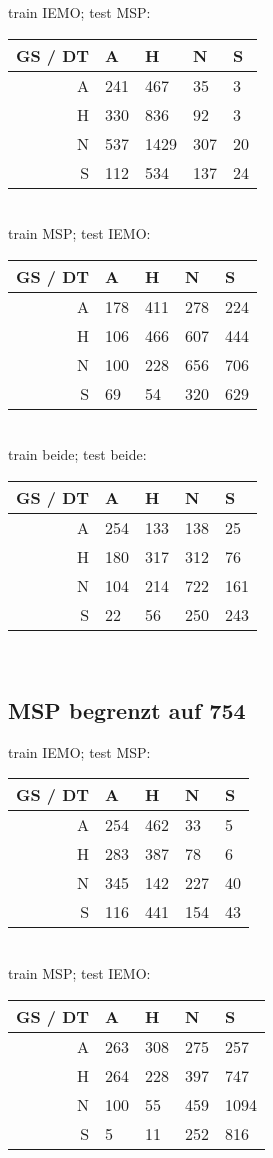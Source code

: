 \documentclass{article}
\begin{document}
train IEMO; test MSP:
\begin{tabular}{|r|llll|}
\hline
GS / DT & A & H & N & S \\
\hline
A & 241 & 467 & 35 & 3 \\
H & 330 & 836 & 92 & 3 \\
N & 537 & 1429 & 307 & 20 \\
S & 112 & 534 & 137 & 24 \\
\hline
\end{tabular} \\
train MSP; test IEMO:
\begin{tabular}{|r|llll|}
\hline
GS / DT & A & H & N & S \\
\hline
A & 178 & 411 & 278 & 224 \\
H & 106 & 466 & 607 & 444 \\
N & 100 & 228 & 656 & 706 \\
S & 69 & 54 & 320 & 629 \\
\hline
\end{tabular} \\
train beide; test beide:
\begin{tabular}{|r|llll|}
\hline
GS / DT & A & H & N & S \\
\hline
A & 254 & 133 & 138 & 25 \\
H & 180 & 317 & 312 & 76 \\
N & 104 & 214 & 722 & 161 \\
S & 22 & 56 & 250 & 243 \\
\hline
\end{tabular} \\

\subsection{MSP begrenzt auf 754}

train IEMO; test MSP:
\begin{tabular}{|r|llll|}
\hline
GS / DT & A & H & N & S \\
\hline
A & 254 & 462 & 33 & 5 \\
H & 283 & 387 & 78 & 6 \\
N & 345 & 142 & 227 & 40 \\
S & 116 & 441 & 154 & 43 \\
\hline
\end{tabular} \\
train MSP; test IEMO:
\begin{tabular}{|r|llll|}
\hline
GS / DT & A & H & N & S \\
\hline
A & 263 & 308 & 275 & 257 \\
H & 264 & 228 & 397 & 747 \\
N & 100 & 55 & 459 & 1094 \\
S & 5 & 11 & 252 & 816 \\
\hline
\end{tabular} \\
\end{document}

